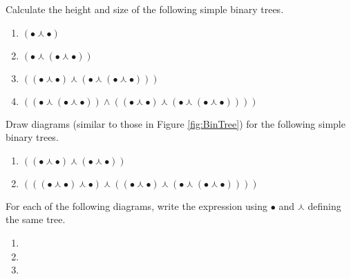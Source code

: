 \begin{exercises}
  \item Calculate the height and size of the following simple binary trees.
    \begin{enumerate}
    \item $(\bullet\curlywedge\bullet)$
    \item $(\bullet\curlywedge (\bullet\curlywedge\bullet))$
    \item $((\bullet\curlywedge\bullet)\curlywedge(\bullet\curlywedge(\bullet\curlywedge\bullet)))$
    \item $((\bullet\curlywedge(\bullet\curlywedge\bullet))\wedge ((\bullet\curlywedge\bullet)\curlywedge(\bullet\curlywedge(\bullet\curlywedge\bullet))))$
    \end{enumerate}
   \item Draw diagrams (similar to those in Figure \ref{fig:BinTree}) for the following
   simple binary trees.
   \begin{enumerate}
   \item $((\bullet \curlywedge \bullet)\curlywedge(\bullet\curlywedge\bullet))$
   \item $(((\bullet\curlywedge\bullet)\curlywedge\bullet)\curlywedge ((\bullet\curlywedge\bullet)\curlywedge(\bullet\curlywedge(\bullet\curlywedge\bullet))))$
   \end{enumerate}
   \item For each of the following diagrams, write the expression using $\bullet$ and $\curlywedge$
    defining the same tree.
\begin{multicols}{2}
    \begin{enumerate}
    \item 
{}

 \item 


\item


    \end{enumerate}
  \end{multicols}
\end{exercises}

